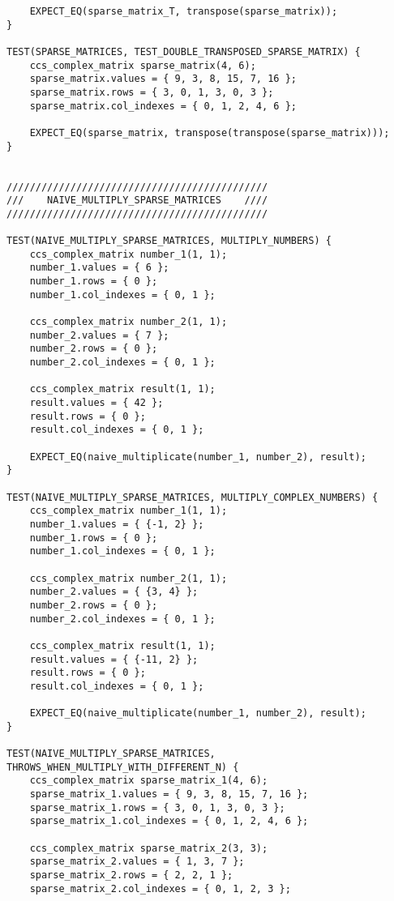 \documentclass{report}
\begin{document}
\begin{lstlisting}
    EXPECT_EQ(sparse_matrix_T, transpose(sparse_matrix));
}

TEST(SPARSE_MATRICES, TEST_DOUBLE_TRANSPOSED_SPARSE_MATRIX) {
    ccs_complex_matrix sparse_matrix(4, 6);
    sparse_matrix.values = { 9, 3, 8, 15, 7, 16 };
    sparse_matrix.rows = { 3, 0, 1, 3, 0, 3 };
    sparse_matrix.col_indexes = { 0, 1, 2, 4, 6 };

    EXPECT_EQ(sparse_matrix, transpose(transpose(sparse_matrix)));
}


/////////////////////////////////////////////
///    NAIVE_MULTIPLY_SPARSE_MATRICES    ////
/////////////////////////////////////////////

TEST(NAIVE_MULTIPLY_SPARSE_MATRICES, MULTIPLY_NUMBERS) {
    ccs_complex_matrix number_1(1, 1);
    number_1.values = { 6 };
    number_1.rows = { 0 };
    number_1.col_indexes = { 0, 1 };
    
    ccs_complex_matrix number_2(1, 1);
    number_2.values = { 7 };
    number_2.rows = { 0 };
    number_2.col_indexes = { 0, 1 };
    
    ccs_complex_matrix result(1, 1);
    result.values = { 42 };
    result.rows = { 0 };
    result.col_indexes = { 0, 1 };

    EXPECT_EQ(naive_multiplicate(number_1, number_2), result);
}

TEST(NAIVE_MULTIPLY_SPARSE_MATRICES, MULTIPLY_COMPLEX_NUMBERS) {
    ccs_complex_matrix number_1(1, 1);
    number_1.values = { {-1, 2} };
    number_1.rows = { 0 };
    number_1.col_indexes = { 0, 1 };
    
    ccs_complex_matrix number_2(1, 1);
    number_2.values = { {3, 4} };
    number_2.rows = { 0 };
    number_2.col_indexes = { 0, 1 };
    
    ccs_complex_matrix result(1, 1);
    result.values = { {-11, 2} };
    result.rows = { 0 };
    result.col_indexes = { 0, 1 };

    EXPECT_EQ(naive_multiplicate(number_1, number_2), result);
}

TEST(NAIVE_MULTIPLY_SPARSE_MATRICES, THROWS_WHEN_MULTIPLY_WITH_DIFFERENT_N) {
    ccs_complex_matrix sparse_matrix_1(4, 6);
    sparse_matrix_1.values = { 9, 3, 8, 15, 7, 16 };
    sparse_matrix_1.rows = { 3, 0, 1, 3, 0, 3 };
    sparse_matrix_1.col_indexes = { 0, 1, 2, 4, 6 };
    
    ccs_complex_matrix sparse_matrix_2(3, 3);
    sparse_matrix_2.values = { 1, 3, 7 };
    sparse_matrix_2.rows = { 2, 2, 1 };
    sparse_matrix_2.col_indexes = { 0, 1, 2, 3 };
    

\end{lstlisting}
\end{document}
